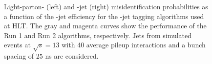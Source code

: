 \begin{figure}
\centering
{}
\caption{
Light-parton- (left) and \cPqc-jet (right) misidentification
probabilities as a function of the \cPqb-jet efficiency for the
\cPqb-jet tagging algorithms used at HLT. The gray and
magenta curves show the performance of the Run 1 and Run 2 algorithms,
respectively. 
Jets from simulated \ttbar events at $\sqrt{s} = 13$ \TeV with 40
average pileup interactions and a bunch spacing of 25 \unit{ns} are considered. 
\label{fig:mcPerformance2015}}
\end{figure}


%
% 
%
%


